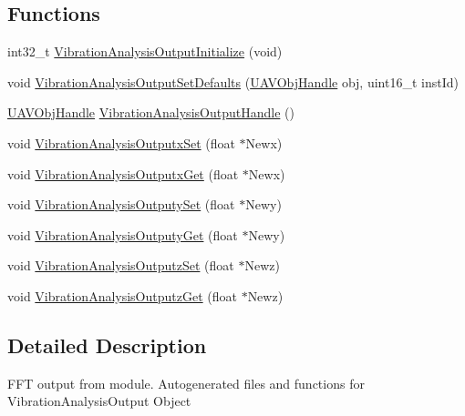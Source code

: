 \subsection*{\-Functions}
\begin{DoxyCompactItemize}
\item 
int32\-\_\-t \hyperlink{group___vibration_analysis_output_ga35340fd55b01cced1688aec9fe1b0f32}{\-Vibration\-Analysis\-Output\-Initialize} (void)
\item 
void \hyperlink{group___vibration_analysis_output_gaccc4044d8ee4ab24cd64928b797d22af}{\-Vibration\-Analysis\-Output\-Set\-Defaults} (\hyperlink{targets_2_u_a_v_objects_2inc_2uavobjectmanager_8h_a279053e22be53ce9f895043aaeb91e3b}{\-U\-A\-V\-Obj\-Handle} obj, uint16\-\_\-t inst\-Id)
\item 
\hyperlink{targets_2_u_a_v_objects_2inc_2uavobjectmanager_8h_a279053e22be53ce9f895043aaeb91e3b}{\-U\-A\-V\-Obj\-Handle} \hyperlink{group___vibration_analysis_output_ga47cc726c018e3a40e886567db170e77b}{\-Vibration\-Analysis\-Output\-Handle} ()
\item 
void \hyperlink{group___vibration_analysis_output_ga81c7d5d05aed81cb5f1e78e8fdf76759}{\-Vibration\-Analysis\-Outputx\-Set} (float $\ast$\-Newx)
\item 
void \hyperlink{group___vibration_analysis_output_ga8ab1579f77f63c759966c15dacc719e3}{\-Vibration\-Analysis\-Outputx\-Get} (float $\ast$\-Newx)
\item 
void \hyperlink{group___vibration_analysis_output_gafcdee5ecf571ac41136ab56dda04613f}{\-Vibration\-Analysis\-Outputy\-Set} (float $\ast$\-Newy)
\item 
void \hyperlink{group___vibration_analysis_output_ga729aca5bafb8505fe236a0428c8ad1d3}{\-Vibration\-Analysis\-Outputy\-Get} (float $\ast$\-Newy)
\item 
void \hyperlink{group___vibration_analysis_output_ga0d6afc7f8bf6aeb20f2cb214e6877477}{\-Vibration\-Analysis\-Outputz\-Set} (float $\ast$\-Newz)
\item 
void \hyperlink{group___vibration_analysis_output_ga03c8b1ea52628f1563439ef800d51535}{\-Vibration\-Analysis\-Outputz\-Get} (float $\ast$\-Newz)
\end{DoxyCompactItemize}


\subsection{\-Detailed \-Description}
\-F\-F\-T output from  module. \-Autogenerated files and functions for \-Vibration\-Analysis\-Output \-Object 

